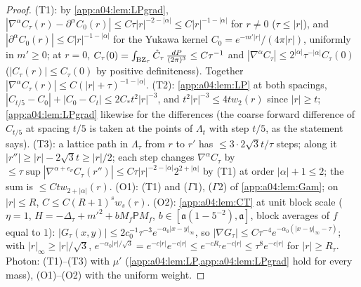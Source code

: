 \begin{proof}
(T1): by \cref{app:a04:lem:LPgrad}, $|\nabla^\alpha C_\tau(r)-\partial^\alpha C_0(r)|\le C\tau|r|^{-2-|\alpha|}\le C|r|^{-1-|\alpha|}$ for $r\ne0$ ($\tau\le|r|$), and $|\partial^\alpha C_0(r)|\le C|r|^{-1-|\alpha|}$ for the Yukawa kernel $C_0=e^{-m'|r|}/(4\pi|r|)$, uniformly in $m'\ge0$; at $r=0$, $C_\tau(0)=\int_{\mathrm{BZ}_\tau}\hat C_\tau\,\tfrac{dP}{(2\pi)^3}\le C\tau^{-1}$ and $|\nabla^\alpha C_\tau|\le2^{|\alpha|}\tau^{-|\alpha|}C_\tau(0)$ ($|C_\tau(r)|\le C_\tau(0)$ by positive definiteness). Together $|\nabla^\alpha C_\tau(r)|\le C(|r|+\tau)^{-1-|\alpha|}$. (T2): \cref{app:a04:lem:LP} at both spacings, $|C_{t/5}-C_0|+|C_0-C_t|\le2C_*t^2|r|^{-3}$, and $t^2|r|^{-3}\le4tw_2(r)$ since $|r|\ge t$; \cref{app:a04:lem:LPgrad} likewise for the differences (the coarse forward difference of $C_{t/5}$ at spacing $t/5$ is taken at the points of $\Lambda_t$ with step $t/5$, as the statement says). (T3): a lattice path in $\Lambda_\tau$ from $r$ to $r'$ has $\le3\cdot2\sqrt3t/\tau$ steps; along it $|r''|\ge|r|-2\sqrt3t\ge|r|/2$; each step changes $\nabla^\alpha C_\tau$ by $\le\tau\sup|\nabla^{\alpha+e_\nu}C_\tau(r'')|\le C\tau|r|^{-2-|\alpha|}2^{2+|\alpha|}$ by (T1) at order $|\alpha|+1\le2$; the sum is $\le Ctw_{2+|\alpha|}(r)$. (O1): (T1) and ($\Gamma$1), ($\Gamma$2) of \cref{app:a04:lem:Gam}; on $|r|\le R$, $C\le C(R+1)^sw_s(r)$. (O2): \cref{app:a04:lem:CT} at unit block scale ($\eta=1$, $H=-\Delta_\tau+m'^2+bM_f\mathsf PM_f$, $b\in[\mathfrak a(1-5^{-2}),\mathfrak a]$, block averages of $f$ equal to $1$): $|G_\tau(x,y)|\le2c_0^{-1}\tau^{-3}e^{-\alpha_0|x-y|_\infty}$, so $|\nabla G_\tau|\le C\tau^{-4}e^{-\alpha_0(|x-y|_\infty-\tau)}$; with $|r|_\infty\ge|r|/\sqrt3$, $e^{-\alpha_0|r|/\sqrt3}=e^{-c|r|}e^{-c|r|}\le e^{-cR_\tau}e^{-c|r|}\le\tau^8e^{-c|r|}$ for $|r|\ge R_\tau$. Photon: (T1)--(T3) with $\mu'$ (\cref{app:a04:lem:LP,app:a04:lem:LPgrad} hold for every mass), (O1)--(O2) with the uniform weight.
\end{proof}

